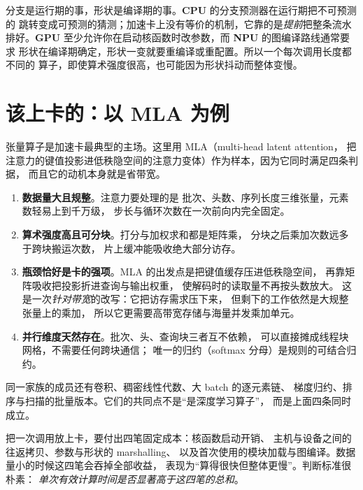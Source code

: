 \documentclass[12pt,a4paper,fontset=fandol]{ctexbook}
\newcommand{\Tp}[1]{\texttt{#1}}
\newcommand{\Dom}[1]{\textsf{\bfseries #1}}
\newcommand{\CPU}{\Dom{CPU}}
\newcommand{\GPU}{\Dom{GPU}}
\newcommand{\NPU}{\Dom{NPU}}
\begin{document}
\begin{note}[title={为什么把\Tp{shape}单独算一把尺子}]
分支是运行期的事，形状是编译期的事。\CPU{} 的分支预测器在运行期把不可预测的
跳转变成可预测的猜测；加速卡上没有等价的机制，它靠的是\emph{提前}把整条流水
排好。\GPU{} 至少允许你在启动核函数时改参数，而 \NPU{} 的图编译路线通常要求
形状在编译期确定，形状一变就要重编译或重配置。所以一个每次调用长度都不同的
算子，即使算术强度很高，也可能因为形状抖动而整体变慢。
\end{note}

\section{该上卡的：以 MLA 为例}

张量算子是加速卡最典型的主场。这里用 MLA（multi-head latent attention，
把注意力的键值投影进低秩隐空间的注意力变体）作为样本，因为它同时满足四条判据，
而且它的动机本身就是省带宽。

\begin{enumerate}
  \item \textbf{数据量大且规整}。注意力要处理的是
        批次、头数、序列长度三维张量，元素数轻易上到千万级，
        步长与循环次数在一次前向内完全固定。
  \item \textbf{算术强度高且可分块}。打分与加权求和都是矩阵乘，
        分块之后乘加次数远多于跨块搬运次数，
        片上缓冲能吸收绝大部分访存。
  \item \textbf{瓶颈恰好是卡的强项}。MLA 的出发点是把键值缓存压进低秩隐空间，
        再靠矩阵吸收把投影折进查询与输出权重，
        使解码时的读取量不再按头数放大。
        这是一次\emph{针对带宽}的改写：它把访存需求压下来，
        但剩下的工作依然是大规整张量上的乘加，
        所以它更需要高带宽存储与海量并发乘加单元。
  \item \textbf{并行维度天然存在}。批次、头、查询块三者互不依赖，
        可以直接摊成线程块网格，不需要任何跨块通信；
        唯一的归约（softmax 分母）是规则的可结合归约。
\end{enumerate}

同一家族的成员还有卷积、稠密线性代数、大 batch 的逐元素链、
梯度归约、排序与扫描的批量版本。它们的共同点不是``是深度学习算子''，
而是上面四条同时成立。

\begin{warning}[title={上卡不是免费的}]
把一次调用放上卡，要付出四笔固定成本：核函数启动开销、
主机与设备之间的往返拷贝、参数与形状的 marshalling、
以及首次使用的模块加载与图编译。数据量小的时候这四笔会吞掉全部收益，
表现为``算得很快但整体更慢''。判断标准很朴素：
\emph{单次有效计算时间是否显著高于这四笔的总和}。
\end{warning}
\end{document}
